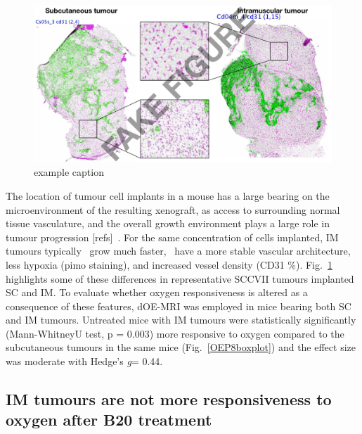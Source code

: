 \begin{figure}[htbp]
   \centering
   \includegraphics[width=\textwidth]{oemri_thesis3/oemri_thesis3-images/3_imsc_zoomed.png} %
   \caption{example caption}
   \label{imsc}
\end{figure}

The location of tumour cell implants in a mouse has a large bearing on the microenvironment of the resulting  xenograft, as access to surrounding normal tissue vasculature, and the overall growth environment plays a large role in tumour progression [refs]~. 
For the same concentration of cells implanted, IM tumours typically~ grow much faster,~ have a more stable vascular architecture, less hypoxia (pimo staining), and increased vessel density (CD31 \%).
Fig.~\ref{imsc} highlights some of these differences in representative SCCVII  tumours implanted SC and IM. 
To evaluate whether oxygen responsiveness is altered as a consequence of these features, \ac{dOE-MRI} was employed in mice bearing both SC and IM tumours.
Untreated mice with IM tumours were statistically significantly (Mann-WhitneyU test, p = 0.003) more responsive to oxygen compared to the subcutaneous tumours in the same mice (Fig.~\ref{OEP8boxplot}) and the effect size was moderate with Hedge's \emph{g}= 0.44.

\subsection{IM tumours are not more responsiveness to oxygen after B20 treatment}

